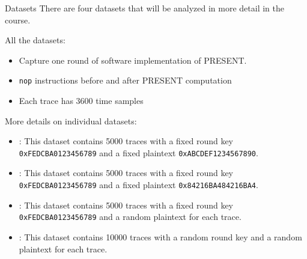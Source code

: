 \begin{frame}{Datasets}
There are four datasets that will be analyzed in more detail in the course.

All the datasets:
\begin{itemize}
    \item Capture one round of software implementation of PRESENT.
    \item \texttt{nop} instructions before and after PRESENT computation
    \item Each trace has $3600$ time samples
\end{itemize}
More details on individual datasets:
\begin{itemize}
    \item \datafixone: This dataset contains 5000 traces with a fixed round key \texttt{0xFEDCBA0123456789} and a fixed plaintext \texttt{0xABCDEF1234567890}. 
    \item \datafixtwo: This dataset contains 5000 traces with a fixed round key \texttt{0xFEDCBA0123456789} and a fixed plaintext \texttt{0x84216BA484216BA4}.
    \item \dataranone: This dataset contains 5000 traces with a fixed round key \texttt{0xFEDCBA0123456789} and a random plaintext for each trace.
    \item \datarantwo: This dataset contains 10000 traces with a random round key and a random plaintext for each trace.
\end{itemize}
\end{frame}


